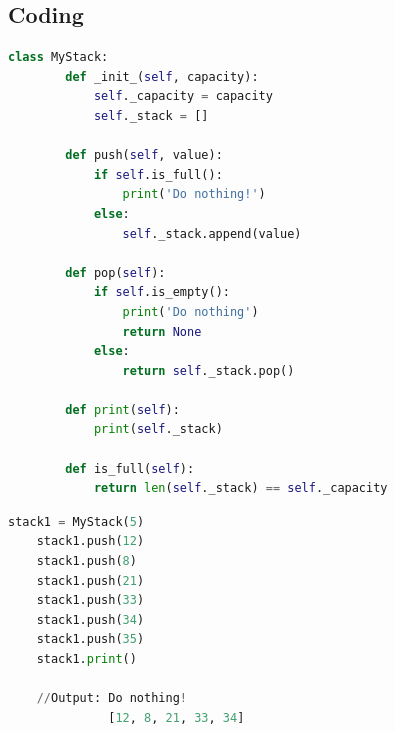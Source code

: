 \subsection{Coding}
\begin{lstlisting}[language=python, caption={Define Stack data structure class}]
	class MyStack:
		def _init_(self, capacity):
			self._capacity = capacity
			self._stack = []
			
		def push(self, value):
			if self.is_full():
				print('Do nothing!')
			else: 
				self._stack.append(value)
				
		def pop(self):
			if self.is_empty():
				print('Do nothing')
				return None
			else:
				return self._stack.pop()
			
		def print(self):
			print(self._stack)
			
		def is_full(self):
			return len(self._stack) == self._capacity
\end{lstlisting}

\begin{lstlisting}[language = python, caption={Push and Pop example}]
	stack1 = MyStack(5)
	stack1.push(12)
	stack1.push(8)
	stack1.push(21)
	stack1.push(33)
	stack1.push(34)
	stack1.push(35)
	stack1.print()
	
	//Output: Do nothing!
			  [12, 8, 21, 33, 34]	  
\end{lstlisting}

